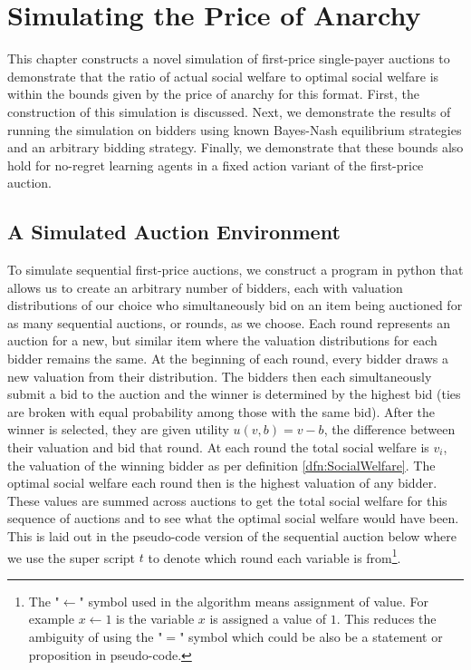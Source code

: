 \documentclass[12pt,twoside]{reedthesis}
\begin{document}
\chapter{Simulating the Price of Anarchy}

This chapter constructs a novel simulation of first-price single-payer auctions to demonstrate that the ratio of actual social welfare to optimal social welfare is within the bounds given by the price of anarchy for this format. First, the construction of this simulation is discussed. Next, we demonstrate the results of running the simulation on bidders using known Bayes-Nash equilibrium strategies and an arbitrary bidding strategy. Finally, we demonstrate that these bounds also hold for no-regret learning agents in a fixed action variant of the first-price auction.

\section{A Simulated Auction Environment}

To simulate sequential first-price auctions, we construct a program in python that allows us to create an arbitrary number of bidders, each with valuation distributions of our choice who simultaneously bid on an item being auctioned for as many sequential auctions, or rounds, as we choose. Each round represents an auction for a new, but similar item where the valuation distributions for each bidder remains the same. At the beginning of each round, every bidder draws a new valuation from their distribution. The bidders then each simultaneously submit a bid to the auction and the winner is determined by the highest bid (ties are broken with equal probability among those with the same bid). After the winner is selected, they are given utility $u(v, b) = v - b$, the difference between their valuation and bid that round. At each round the total social welfare is $v_i$, the valuation of the winning bidder as per definition \ref{dfn:SocialWelfare}. The optimal social welfare each round then is the highest valuation of any bidder. These values are summed across auctions to get the total social welfare for this sequence of auctions and to see what the optimal social welfare would have been. This is laid out in the pseudo-code version of the sequential auction below where we use the super script $t$ to denote which round each variable is from\footnote{The "$\leftarrow$" symbol used in the algorithm means assignment of value. For example $x \leftarrow 1$ is the variable $x$ is assigned a value of $1$. This reduces the ambiguity of using the "$=$" symbol which could be also be a statement or proposition in pseudo-code.}.\\
\end{document}
